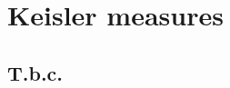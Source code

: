 \chapter{Keisler measures}
\label{measures}

\def\medrel#1{\parbox[t]{5ex}{$\displaystyle\hfil #1$}}
\def\ceq#1#2#3{\parbox[t]{18ex}{$\displaystyle #1$}\medrel{#2}{$\displaystyle #3$}}

\section{T.b.c.}
